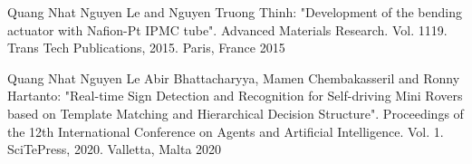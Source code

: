



\begin{cvhonors}

  \cvhonor
    {Quang Nhat Nguyen Le} 
    {and Nguyen Truong Thinh: "Development of the bending actuator with Nafion-Pt IPMC tube". Advanced Materials Research. Vol. 1119. Trans Tech Publications, 2015.} %
    {Paris, France} %
    {2015} %
    
      \cvhonor
    {Quang Nhat Nguyen Le} 
    { Abir Bhattacharyya, Mamen Chembakasseril and Ronny Hartanto: "Real-time Sign Detection and Recognition for Self-driving Mini Rovers based on Template Matching and Hierarchical Decision Structure". Proceedings of the 12th International Conference on Agents and Artificial Intelligence. Vol. 1. SciTePress, 2020.} %
    {Valletta, Malta} %
    {2020} %
\end{cvhonors}
